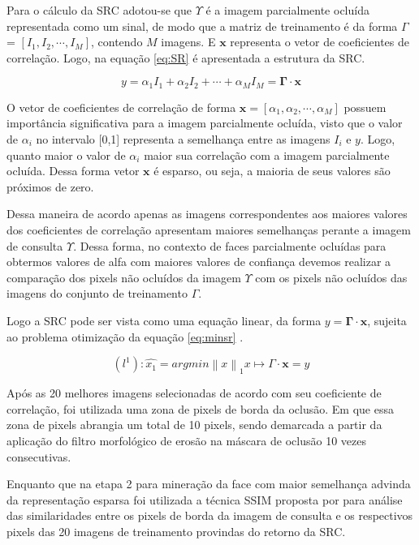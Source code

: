 Para o cálculo da SRC adotou-se que $\Upsilon$ é a imagem parcialmente ocluída representada como um sinal, de modo que a matriz de treinamento é da forma $\Gamma$ = $[I_1,I_2,\cdots, I_M]$, contendo $M$ imagens. E $\mathbf{x}$ representa o vetor de coeficientes de correlação. Logo, na equação \ref{eq:SR} é apresentada a estrutura da SRC.

\begin{equation}
y = \alpha_1I_1 + \alpha_2I_2 + \cdots + \alpha_MI_M = \mathbf{\Gamma} \cdot \mathbf{x}
\label{eq:SR}
\end{equation}

O vetor de coeficientes de correlação de forma $\mathbf{x} = [\alpha_1,\alpha_2, \cdots, \alpha_M]$ possuem importância significativa para a imagem parcialmente ocluída, visto que o valor de $\alpha_i$ no intervalo [0,1] representa a semelhança entre as imagens $I_i$ e $y$. Logo, quanto maior o valor de $\alpha_i$ maior sua correlação com a imagem parcialmente ocluída. Dessa forma vetor $\mathbf{x}$ é esparso, ou seja, a maioria de seus valores são próximos de zero. 

Dessa maneira de acordo  apenas as imagens correspondentes aos maiores valores dos coeficientes de correlação apresentam maiores semelhanças perante a imagem de consulta $\Upsilon$. Dessa forma, no contexto de faces parcialmente ocluídas para obtermos valores de alfa com maiores valores de confiança devemos realizar a comparação dos pixels não ocluídos da imagem $\Upsilon$ com os pixels não ocluídos das imagens do conjunto de treinamento $\Gamma$.

Logo a SRC pode ser vista como uma equação linear, da forma $y = \mathbf{\Gamma} \cdot \mathbf{x}$, sujeita ao problema otimização da equação \ref{eq:minsr} .

\begin{equation}
\label{eq:minsr}
(l^1): \hat{x_1} = argmin\left \| x \right \|_1  x \mapsto  \Gamma \cdot \mathbf{x} = y
\end{equation}


Após as 20 melhores imagens selecionadas de acordo com seu coeficiente de correlação, foi utilizada uma zona de pixels de borda da oclusão. Em que essa zona de pixels abrangia um total de 10 pixels, sendo demarcada a partir da aplicação do filtro morfológico de erosão na máscara de oclusão 10 vezes consecutivas.



Enquanto que na etapa 2 para mineração da face com maior semelhança advinda da representação esparsa foi utilizada a técnica SSIM proposta por  para análise das similaridades entre os pixels de borda da imagem de consulta e os respectivos pixels das 20 imagens de treinamento provindas do retorno da SRC.

